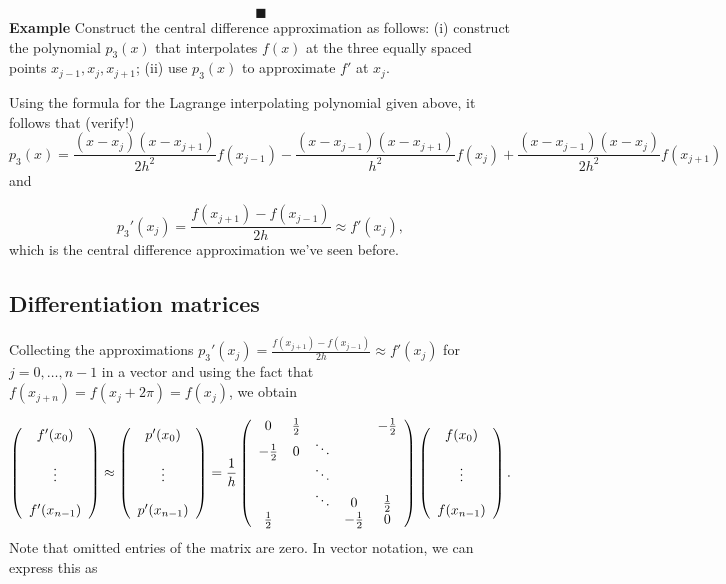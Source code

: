 \documentclass[12pt,landscape]{article}
\begin{document}
{\[
\blacksquare
\]
\newpage
\textbf{Example} Construct the central difference approximation as follows: (i) construct the polynomial $p_3(x)$ that interpolates $f(x)$  at the three equally spaced points $x_{j-1}, x_j, x_{j+1}$; (ii) use $p_3(x)$ to approximate  $f'$ at $x_j$.

Using the formula for the Lagrange interpolating polynomial given above, it follows that (verify!)
{\LARGE
\[
p_3(x) = \frac{(x-x_{j})(x-x_{j+1})}{2h^2}f(x_{j-1}) - \frac{(x-x_{j-1})(x-x_{j+1})}{h^2}f(x_{j}) + \frac{(x-x_{j-1})(x-x_{j})}{2h^2}f(x_{j+1})
\]}
and

\[
p_3'(x_j) = \frac{f(x_{j+1}) - f(x_{j-1})}{2h}  \approx f'(x_j),
\]
which is the central difference approximation we've seen before.
\newpage

\subsection{Differentiation matrices}
Collecting the approximations $p_3'(x_j) = \frac{f(x_{j+1}) - f(x_{j-1})}{2h}  \approx f'(x_j)$ for $j = 0, \ldots, n-1$ in a vector and using the fact that $f(x_{j+n}) = f(x_j + 2\pi) = f(x_{j})$, we obtain

\[
\left(
\begin{array}{c c c c c}
f'(x_0) \\
  \\
\vdots  \\
  \\
f'(x_{n-1})
\end{array}
\right) \approx 
\left(
\begin{array}{c c c c c}
p'(x_0) \\
  \\
\vdots  \\
  \\
p'(x_{n-1})
\end{array}
\right) = \frac{1}{h}
\left(
\begin{array}{c c c c c}
0 & \frac{1}{2} &   &   &  -\frac{1}{2} \\
-\frac{1}{2} & 0 & \ddots &  &  \\
   &   & \ddots &  &   \\
   &   & \ddots & 0 &  \frac{1}{2} \\
 \frac{1}{2}  &   &   & -\frac{1}{2} & 0
\end{array}
\right)
\left(
\begin{array}{c c c c c}
f(x_0) \\
  \\
\vdots  \\
  \\
f(x_{n-1})
\end{array}
\right).
\]
Note that omitted entries of the matrix are zero.  In vector notation, we can express this as

}
\end{document}
